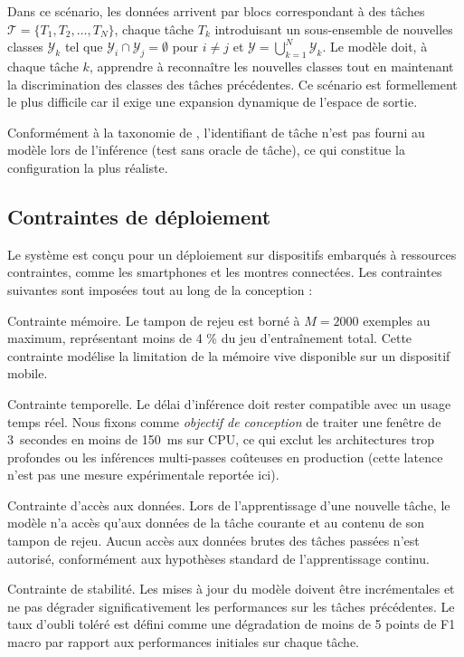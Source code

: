 \documentclass[a4paper,12pt]{report}
\begin{document}
Dans ce scénario, les données arrivent par blocs correspondant à des tâches $\mathcal{T} = \{T_1, T_2, \ldots, T_N\}$, chaque tâche $T_k$ introduisant un sous-ensemble de nouvelles classes $\mathcal{Y}_k$ tel que $\mathcal{Y}_i \cap \mathcal{Y}_j = \emptyset$ pour $i \neq j$ et $\mathcal{Y} = \bigcup_{k=1}^{N} \mathcal{Y}_k$. Le modèle doit, à chaque tâche $k$, apprendre à reconnaître les nouvelles classes tout en maintenant la discrimination des classes des tâches précédentes. Ce scénario est formellement le plus difficile car il exige une expansion dynamique de l'espace de sortie.

Conformément à la taxonomie de \parencite{vdven2022}, l'identifiant de tâche n'est pas fourni au modèle lors de l'inférence (test sans oracle de tâche), ce qui constitue la configuration la plus réaliste.

\subsection{Contraintes de déploiement}

Le système est conçu pour un déploiement sur dispositifs embarqués à ressources contraintes, comme les smartphones et les montres connectées. Les contraintes suivantes sont imposées tout au long de la conception :

Contrainte mémoire. Le tampon de rejeu est borné à $M = 2000$ exemples au maximum, représentant moins de 4 \% du jeu d'entraînement total. Cette contrainte modélise la limitation de la mémoire vive disponible sur un dispositif mobile.

Contrainte temporelle. Le délai d'inférence doit rester compatible avec un usage
temps réel. Nous fixons comme \emph{objectif de conception} de traiter une
fenêtre de 3~secondes en moins de 150~ms sur CPU, ce qui exclut les
architectures trop profondes ou les inférences multi-passes coûteuses en
production (cette latence n'est pas une mesure expérimentale reportée ici).

Contrainte d'accès aux données. Lors de l'apprentissage d'une nouvelle tâche, le modèle n'a accès qu'aux données de la tâche courante et au contenu de son tampon de rejeu. Aucun accès aux données brutes des tâches passées n'est autorisé, conformément aux hypothèses standard de l'apprentissage continu.

Contrainte de stabilité. Les mises à jour du modèle doivent être incrémentales et ne pas dégrader significativement les performances sur les tâches précédentes. Le taux d'oubli toléré est défini comme une dégradation de moins de 5 points de F1 macro par rapport aux performances initiales sur chaque tâche.
\end{document}
